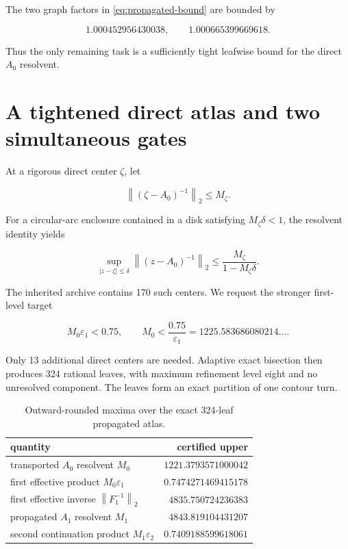 \documentclass[11pt]{article}
\theoremstyle{definition}
\theoremstyle{remark}
\newcommand{\norm}[1]{\left\lVert #1\right\rVert}
\newcommand{\eps}{\varepsilon}
\begin{document}
The two graph factors in \eqref{eq:propagated-bound} are bounded by

\[
1.000452956430038,\qquad1.000665399669618.
\]

Thus the only remaining task is a sufficiently tight leafwise bound for the
direct $A_0$ resolvent.

\section{A tightened direct atlas and two simultaneous gates}
\label{sec:atlas}

At a rigorous direct center \(\zeta\), let

\[
\norm{(\zeta-A_0)^{-1}}_2\le M_\zeta.
\]

For a circular-arc enclosure contained in a disk satisfying
$M_\zeta\delta<1$, the resolvent identity yields

\begin{equation}
 \sup_{|z-\zeta|\le\delta}\norm{(z-A_0)^{-1}}_2
 \le\frac{M_\zeta}{1-M_\zeta\delta}.
 \label{eq:center-transport}
\end{equation}

The inherited archive contains 170 such centers.  We request the stronger
first-level target

\begin{equation}
 M_0\eps_1<0.75,
 \qquad
 M_0<\frac{0.75}{\eps_1}=1225.583686080214\ldots.
 \label{eq:tight-target}
\end{equation}

Only 13 additional direct centers are needed.  Adaptive exact bisection then
produces 324 rational leaves, with maximum refinement level eight and no
unresolved component.  The leaves form an exact partition of one contour
turn.

\begin{table}[H]
\centering
\caption{Outward-rounded maxima over the exact 324-leaf propagated atlas.}
\label{tab:atlas}
\begin{tabular}{lr}
\toprule
quantity & certified upper\\
\midrule
transported $A_0$ resolvent $M_0$ & $1221.3793571000042$\\
first effective product $M_0\eps_1$ & $0.7474271469415178$\\
first effective inverse $\norm{F_1^{-1}}_2$ & $4835.750724236383$\\
propagated $A_1$ resolvent $M_1$ & $4843.819104431207$\\
second continuation product $M_1\eps_2$ & $0.7409188599618061$\\
\bottomrule
\end{tabular}
\end{table}
\end{document}
